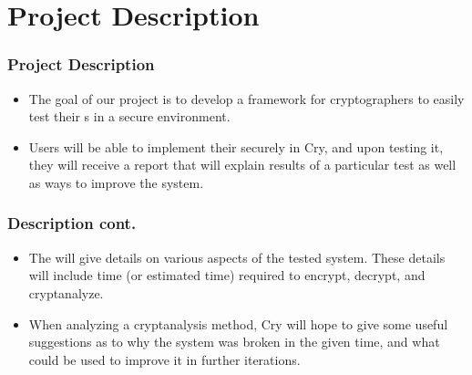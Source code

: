 \section{Project Description}


\begin{frame}
\frametitle{Project Description}
  \begin{itemize}
  \item The goal of our project is to develop a framework for
    cryptographers to easily test their \cs s in a
    secure environment.
  \item Users will be able to implement their
    \cs{} securely in Cry, and upon testing it, they will
    receive a report that will explain results of a particular
    test as well as ways to improve the system.
  \end{itemize}
\end{frame}

\begin{frame}
\frametitle{Description cont.}
  \begin{itemize}
  \item The will give details on various aspects of the tested system.
    These details will include time (or estimated time) required
    to encrypt, decrypt, and cryptanalyze.
  \item When analyzing a
    cryptanalysis method, Cry will hope to give some useful
    suggestions as to why the system was broken in the given
    time, and what could be used to improve it in further
    iterations.
  \end{itemize}
\end{frame}

